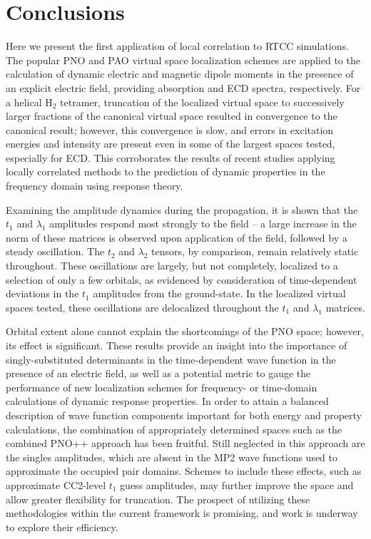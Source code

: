 
\section{Conclusions} \label{conc} Here we present the first application
of local correlation to RTCC simulations. The popular PNO and PAO virtual
space localization schemes are applied to the calculation of dynamic electric
and magnetic dipole moments in the presence of an explicit electric field,
providing absorption and ECD spectra, respectively. 
For a helical H$_2$ tetramer, truncation of the
localized virtual space to successively larger fractions of the canonical
virtual space resulted in convergence to the canonical result; however, this
convergence is slow, and errors in excitation energies and intensity are
present even in some of the largest spaces tested, especially for ECD. This
corroborates the results of recent studies applying locally correlated
methods to the prediction of dynamic properties in the frequency domain
using response theory.

Examining the amplitude
dynamics during the propagation, it is shown that the $t_1$ and $\lambda_1$
amplitudes respond most strongly to the field -- a large increase in the
norm of these matrices is observed upon application of the field, followed
by a steady oscillation. The $t_2$ and $\lambda_2$ tensors, by comparison,
remain relatively static throughout. 
These oscillations are largely, but not completely, localized to a selection 
of only a few orbitals, as evidenced by consideration of 
time-dependent deviations in the $t_1$ amplitudes from the ground-state.
In the localized virtual spaces tested,
these oscillations are delocalized throughout the $t_1$ and $\lambda_1$
matrices. 

Orbital extent alone cannot explain the shortcomings of 
the PNO space; however, its effect is significant. 
These results provide an insight into the importance of 
singly-substituted determinants in the time-dependent wave function in the 
presence of an electric field, as well as a potential metric to gauge the 
performance of new localization schemes for frequency- or time-domain 
calculations of dynamic response properties.
In order to attain a balanced description of wave function components 
important for both energy and property calculations, the combination 
of appropriately determined spaces such as the combined PNO++ approach
has been fruitful.\cite{DCunha2021} 
Still neglected in this approach
are the singles amplitudes, which are absent in the MP2 wave functions
used to approximate the occupied pair domains. Schemes to include 
these effects, such as approximate CC2-level $t_1$ guess amplitudes,
may further improve the space and allow greater flexibility for 
truncation. The prospect of utilizing these 
methodologies within the current framework is promising, and work is 
underway to explore their efficiency.
